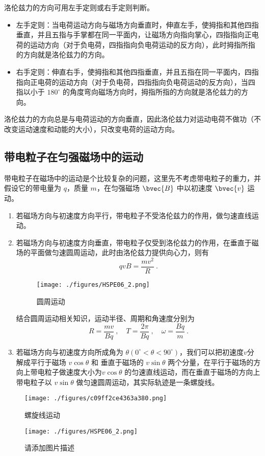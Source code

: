 洛伦兹力的方向可用左手定则或右手定则判断。

\begin{itemize}
\item 左手定则：当电荷运动方向与磁场方向垂直时，伸直左手，使拇指和其他四指垂直，并且五指与手掌都在同一平面内，让磁场方向指向掌心，四指指向正电荷的运动方向（对于负电荷，四指指向负电荷运动的反方向），此时拇指所指的方向就是洛伦兹力的方向。
\item 右手定则：伸直右手，使拇指和其他四指垂直，并且五指在同一平面内，四指指向正电荷的运动方向（对于负电荷，四指指向负电荷运动的反方向），当四指以小于 $180^\circ$ 的角度弯向磁场方向时，拇指所指的方向就是洛伦兹力的方向。
\end{itemize}

洛伦兹力的方向总是与电荷运动的方向垂直，因此洛伦兹力对运动电荷不做功（不改变运动速度和动能的大小），只改变电荷的运动方向。

\subsection{带电粒子在匀强磁场中的运动}


带电粒子在磁场中的运动是个比较复杂的问题，这里先不考虑带电粒子的重力，并假设它的带电量为 $q$，质量 $m$，在匀强磁场 $\bvec{B}$ 中以初速度 $\bvec{v}$ 运动。

\begin{enumerate}
\item 若磁场方向与初速度方向平行，带电粒子不受洛伦兹力的作用，做匀速直线运动。

\item 若磁场方向与初速度方向垂直，带电粒子仅受到洛伦兹力的作用，在垂直于磁场的平面做匀速圆周运动，此时由洛伦兹力提供向心力，则有
\begin{equation}
qvB=\frac{mv^2}{R}~.
\end{equation}

\begin{figure}[ht]
\centering
\texttt{[image: ./figures/HSPE06\_2.png]}
\caption{圆周运动} \label{fig_HSPE06_2}
\end{figure}

结合圆周运动相关知识，运动半径、周期和角速度分别为
\begin{equation}
R=\frac{mv}{Bq}~, \quad T=\frac{2\pi}{Bq}~, \quad \omega=\frac{Bq}{m}~.
\end{equation}

\item 若磁场方向与初速度方向所成角为 $\theta (0^\circ < \theta < 90^\circ)$，我们可以把初速度$v$分解成平行于磁场 $v \cos \theta$ 和 垂直于磁场的 $v \sin \theta$ 两个分量，在平行于磁场的方向上带电粒子做速度大小为$v \cos \theta$ 的匀速直线运动，而在垂直于磁场的方向上带电粒子以 $v \sin \theta$ 做匀速圆周运动，其实际轨迹是一条螺旋线。
\end{enumerate}

\begin{figure}[ht]
\centering
\texttt{[image: ./figures/c09ff2ce4363a380.png]}
\caption{螺旋线运动} \label{fig_HSPE06_3}
\end{figure}\begin{figure}[ht]
\centering
\texttt{[image: ./figures/HSPE06\_2.png]}
\caption{请添加图片描述} \label{HSPE06_fig2}
\end{figure}